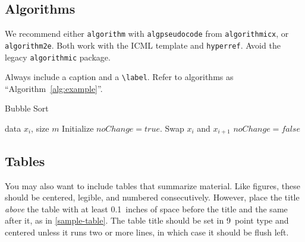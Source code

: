 \documentclass{article}
\theoremstyle{plain}
\theoremstyle{definition}
\theoremstyle{remark}
\begin{document}
\subsection{Algorithms}

We recommend either \texttt{algorithm} with \texttt{algpseudocode} from \texttt{algorithmicx}, or \texttt{algorithm2e}. 
Both work with the ICML template and \texttt{hyperref}. Avoid the legacy \texttt{algorithmic} package.

Always include a caption and a \verb|\label|. Refer to algorithms as ``Algorithm~\ref{alg:example}''.



\begin{algorithm}[tb]
  \caption{Bubble Sort}
  \label{alg:example}
  \begin{algorithmic}
     data $x_i$, size $m$
    \REPEAT
    \STATE Initialize $noChange = true$.
    \STATE Swap $x_i$ and $x_{i+1}$
    \STATE $noChange = false$
    \ENDIF
    \ENDFOR
  \end{algorithmic}
\end{algorithm}


\subsection{Tables}

You may also want to include tables that summarize material. Like figures,
these should be centered, legible, and numbered consecutively. However, place
the title \emph{above} the table with at least 0.1~inches of space before the
title and the same after it, as in \cref{sample-table}. The table title should
be set in 9~point type and centered unless it runs two or more lines, in which
case it should be flush left.

\end{document}
